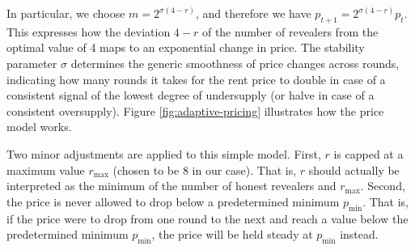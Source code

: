 In particular, we choose $m = 2^{\sigma(4 - r)}$, and therefore we have $p_{t+1} = 2^{\sigma(4 - r)} p_t$. This expresses how the deviation $4 - r$ of the number of revealers from the optimal value of 4 maps to an exponential change in price. The stability parameter $\sigma$ determines the generic smoothness of price changes across rounds, indicating how many rounds it takes for the rent price to double in case of a consistent signal of the lowest degree of undersupply (or halve in case of a consistent oversupply). Figure \ref{fig:adaptive-pricing} illustrates how the price model works.

Two minor adjustments are applied to this simple model. First, $r$ is capped at a maximum value $r_{\text{max}}$ (chosen to be 8 in our case). That is, $r$ should actually be interpreted as the minimum of the number of honest revealers and $r_{\text{max}}$. Second, the price is never allowed to drop below a predetermined minimum $p_{\text{min}}$. That is, if the price were to drop from one round to the next and reach a value below the predetermined minimum $p_{\text{min}}$, the price will be held steady at $p_{\text{min}}$ instead. 

